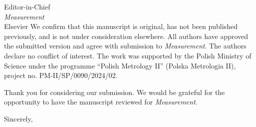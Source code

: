 \documentclass[10pt]{letter}
\begin{document}
\begin{letter}{Editor-in-Chief\\
\textit{Measurement}\\
Elsevier}
We confirm that this manuscript is original, has not been published previously, and is not under consideration elsewhere. All authors have approved the submitted version and agree with submission to \textit{Measurement}. The authors declare no conflict of interest. The work was supported by the Polish Ministry of Science under the programme ``Polish Metrology II'' (Polska Metrologia II), project no. PM-II/SP/0090/2024/02.

Thank you for considering our submission. We would be grateful for the opportunity to have the manuscript reviewed for \textit{Measurement}.

\closing{Sincerely,}

\end{letter}
\end{document}
